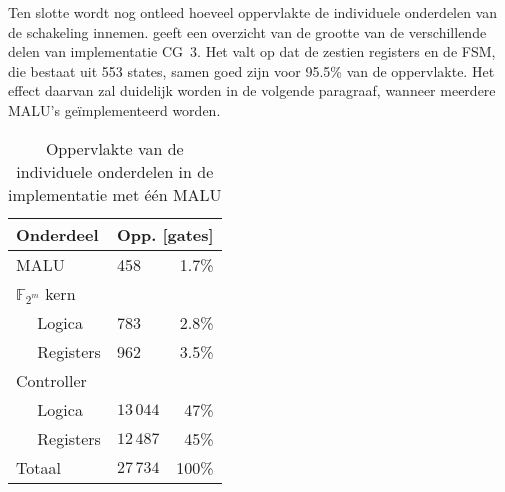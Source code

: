 
Ten slotte wordt nog ontleed hoeveel oppervlakte de individuele onderdelen van de schakeling innemen.  geeft een overzicht van de grootte van de verschillende delen van implementatie CG~3. Het valt op dat de zestien registers en de FSM, die bestaat uit 553 states, samen goed zijn voor 95.5\% van de oppervlakte. Het effect daarvan zal duidelijk worden in de volgende paragraaf, wanneer meerdere MALU's ge\"implementeerd worden.

\begin{table}[h]
	\caption{Oppervlakte van de individuele onderdelen in de implementatie met \'e\'en MALU}
	\label{tabel-resultaten-onderdelen}

	\centering
	\begin{tabular}{llr}
		\toprule
		Onderdeel					& \multicolumn{2}{c}{Opp. [gates]}\\
		\midrule
		MALU				 			& 458			& 1.7\%\\
		$\mathbb{F}_{2^m}$ kern	&				& \\
		$\quad$ Logica				& 783			& 2.8\%\\
		$\quad$ Registers			& 962			& 3.5\%\\
		Controller					&				& \\
		$\quad$ Logica				& $13\,044$	& 47\%\\
		$\quad$ Registers			& $12\,487$	& 45\%\\
		\midrule
		Totaal						& $27\,734$	& 100\%\\
		\bottomrule		
	\end{tabular}
\end{table}



